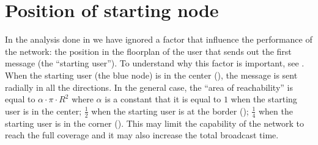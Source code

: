 \chapter{Position of starting node}\label{ch:starting-node}

In the analysis done in  we have ignored a factor that
influence the performance of the network: the position in the floorplan of the
user that sends out the first message (the ``starting user''). To understand why
this factor is important, see . When the starting
user (the blue node) is in the center (), the
message is sent radially in all the directions. In the general case, the ``area
of reachability'' is equal to \(\alpha\cdot\pi\cdot R^2\) where \(\alpha\) is a
constant that it is equal to \(1\) when the starting user is in the center;
\(\frac{1}{2}\) when the starting user is at the border
(); \(\frac{1}{4}\) when the starting user is in
the corner (). This may limit the capability of
the network to reach the full coverage and it may also increase the total
broadcast time.

